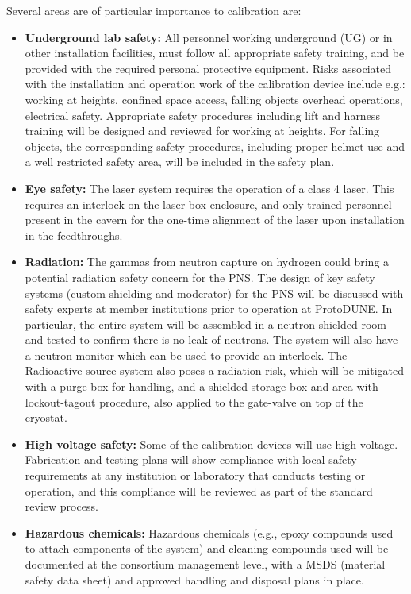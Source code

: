 Several areas are of particular importance to calibration are:
\begin{itemize}
\item {\bf Underground lab safety:} All personnel working underground (UG) or in other installation facilities, must follow all appropriate safety training, and be provided with the required personal protective equipment. Risks associated with the installation and operation work of the calibration device include e.g.: working at heights, confined space access, falling objects overhead operations, electrical safety. Appropriate safety procedures including lift and harness training will be designed and reviewed for working at heights. For falling objects, the corresponding safety procedures, including proper helmet use and a well restricted safety area, will be included in the safety plan.

\item {\bf Eye safety:} The laser system requires the operation of a class 4 laser. This requires an interlock on the laser box enclosure, and only trained personnel present in the cavern for the one-time alignment of the laser upon installation in the feedthroughs.

\item {\bf Radiation:} The gammas from neutron capture on hydrogen could bring a potential radiation safety concern for the PNS. The design of key safety systems (custom shielding and moderator) for the PNS will be discussed with safety experts at member institutions
prior to operation at ProtoDUNE. In particular, the entire system will be assembled in a neutron shielded room and tested to confirm there is no leak of neutrons. The system will also have a neutron monitor which can be used to provide an interlock. The Radioactive source system also poses a radiation risk, which will be mitigated with a purge-box for handling, and a shielded storage box and area with lockout-tagout procedure, also applied to the gate-valve on top of the cryostat.

\item {\bf High voltage safety:} Some of the calibration devices will use high voltage. Fabrication and testing plans will show compliance with local  safety requirements at any institution or laboratory that conducts testing or operation, and this compliance will be reviewed as part of the standard review process.

\item {\bf Hazardous chemicals:} Hazardous chemicals (e.g., epoxy compounds used to attach components of the system) and cleaning compounds used will be documented at the consortium management level, with a MSDS (material safety data sheet) and approved handling and disposal plans in place.


\end{itemize}
